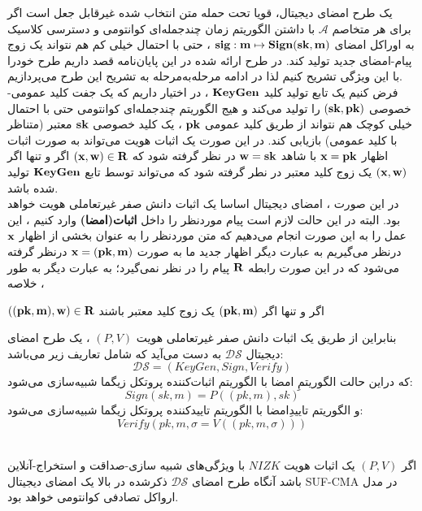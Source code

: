 یک طرح امضای دیجیتال، قویا تحت حمله متن انتخاب شده
 غیرقابل جعل 
است اگر برای هر متخاصم
$\mathcal{A}$
با داشتن الگوریتم زمان چندجمله‌ای کوانتومی و دسترسی کلاسیک به اوراکل امضای 
$\bf sig : m \mapsto Sign(sk,m)$
، حتی با احتمال خیلی کم هم نتواند یک زوج پیام-امضای جدید تولید کند. در طرح ارائه شده در این پایان‌نامه قصد داریم طرح خودرا با این ویژگی تشریح کنیم لذا در ادامه مرحله‌به‌مرحله به تشریح این طرح می‌پردازیم.
\\
فرض ‌کنیم یک تابع تولید کلید 
$\bf KeyGen$
، در اختیار داریم که یک جفت کلید عمومی-خصوصی
$\bf (sk,pk)$
را تولید می‌کند و هیج الگوریتم چندجمله‌ای کوانتومی حتی با احتمال خیلی کوچک  هم نتواند از طریق کلید عمومی
$\bf pk$
، یک کلید خصوصی
$\bf sk$
معتبر (متناظر با کلید عمومی) بازیابی کند. در این صورت یک اثبات هویت می‌تواند به صورت اثبات اظهار 
$\bf x=pk$
با شاهد 
$\bf w = sk$
در نظر گرفته شود که 
$\bf (x,w) \in R$
اگر و تنها اگر
$\bf (x,w)$
یک زوج کلید معتبر در نطر گرفته شود که می‌تواند توسط تابع 
$\bf KeyGen$
تولید شده باشد.	
\\
در این صورت ، امضای دیجیتال اساسا یک اثبات دانش صفر غیرتعاملی هویت  خواهد بود. البته  در این حالت لازم است پیام موردنظر را داخل
{\bf{اثبات(امضا)}}
وارد کنیم ، این عمل را به این صورت انجام می‌دهیم که متن موردنظر را به عنوان بخشی از اظهار 
$\bf x$
درنظر می‌گیریم به عبارت دیگر اظهار جدید ما به صورت 
$\bf x = (pk,m)$
درنظر گرفته می‌شود که در این صورت رابطه 
$\bf R $
پیام را در نظر نمی‌گیرد؛ به عبارت دیگر به طور خلاصه ،
\begin{center}
$\bf ((pk,m),w) \in R$
\quad
اگر و تنها اگر
\quad
$\bf (pk,m)$
یک زوج کلید معتبر باشند	
\end{center}	
بنابراین از طریق یک اثبات دانش صفر غیرتعاملی هویت
$ (P,V)$
، یک طرح امضای دیجیتال 
$ \mathcal{DS}$
به دست می‌آید که شامل تعاریف زیر می‌باشد:
\newline
\newline
$$ \mathcal{DS} = (KeyGen,Sign,Verify)$$
که دراین حالت الگوریتمِ امضا با الگوریتم اثبات‌کننده پروتکل زیگما شبیه‌سازی می‌شود:
$$ Sign(sk,m) = P((pk,m),sk)$$
و الگوریتم تاییدِامضا با الگوریتم تاییدکننده پروتکل زیگما شبیه‌سازی می‌شود:
$$ Verify(pk,m,\sigma = V((pk,m,\sigma)))$$
\\
\begin{theorem}
	
	اگر 
	$(P,V)$
	یک اثبات هویت 
	$NIZK$ 
	با ویژگی‌های شبیه ‌سازی-صداقت و استخراج-آنلاین باشد آنگاه طرح امضای
	$\mathcal{DS}$
	ذکرشده در بالا یک امضای دیجیتال
	SUF-CMA
	در مدل ارواکل تصادفی کوانتومی خواهد بود.
	
\end{theorem}

